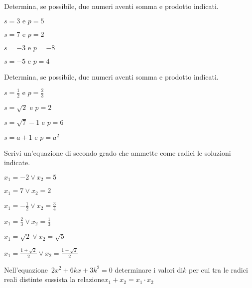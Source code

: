\begin{esercizio}
 \label{ese:3.77}
Determina, se possibile, due numeri aventi somma e prodotto indicati.
\begin{multicols}{2}
\begin{enumeratea}
\item$s = 3 \text{ e } p = 5$
\item$s = 7 \text{ e } p = 2$
\item$s =-3 \text{ e } p =-8$
\item$s =-5 \text{ e } p = 4$
\end{enumeratea}
\end{multicols}
\end{esercizio}

\begin{esercizio}
 \label{ese:3.78}
Determina, se possibile, due numeri aventi somma e prodotto indicati.
\begin{multicols}{2}
\begin{enumeratea}
\item$s = \frac{1}{2} \text{ e } p = \frac{2}{3}$
\item$s = \sqrt{2} \text{ e } p = 2$
\item$s = \sqrt{7}-1 \text{ e } p = 6$
\item$s = a + 1 \text{ e } p= a^{2}$
\end{enumeratea}
\end{multicols}
\end{esercizio}

\begin{esercizio}
 \label{ese:3.79}
Scrivi un'equazione di secondo grado che ammette come radici le soluzioni 
indicate.
\begin{multicols}{2}
\begin{enumeratea}
\item$x_{1} =-2 \vee x_{2} = 5$
\item$x_{1} = 7 \vee x_{2} = 2$
\item$x_{1} =-\frac{1}{2} \vee x_{2} = \frac{3}{4}$
\item$x_{1} = \frac{2}{3} \vee x_{2} = \frac{1}{3}$
\item$x_{1} = \sqrt{2} \vee x_{2} = \sqrt{5}$
\item$x_{1} = \frac{1 + \sqrt{2}}{2} \vee x_{2} = \frac{1-\sqrt{2}}{2}$
\end{enumeratea}
\end{multicols}
\end{esercizio}

\begin{esercizio}
 \label{ese:3.80}
Nell'equazione~$2 x^{2} + 6 k x + 3 k^{2} = 0$ determinare i valori di$k$ per 
cui tra le radici reali distinte sussista la relazione$x_{1} + x_{2} = x_{1} 
\cdot x_{2}$
\end{esercizio}

